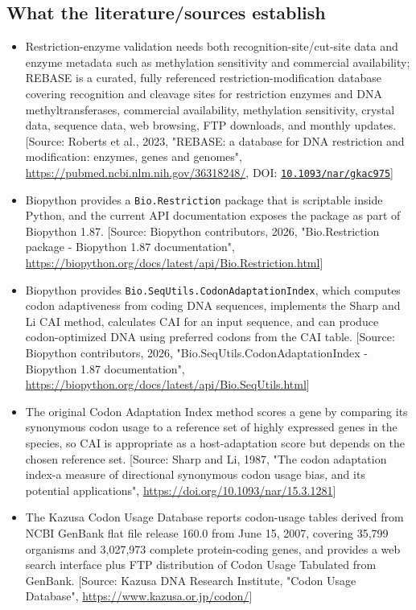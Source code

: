 \documentclass[11pt]{report}
\begin{document}
\subsection{What the literature/sources establish}
\begin{itemize}
\item Restriction-enzyme validation needs both recognition-site/cut-site data and enzyme metadata such as methylation sensitivity and commercial availability; REBASE is a curated, fully referenced restriction-modification database covering recognition and cleavage sites for restriction enzymes and DNA methyltransferases, commercial availability, methylation sensitivity, crystal data, sequence data, web browsing, FTP downloads, and monthly updates. [Source: Roberts et al., 2023, "REBASE: a database for DNA restriction and modification: enzymes, genes and genomes", \url{https://pubmed.ncbi.nlm.nih.gov/36318248/}, DOI: \href{https://doi.org/10.1093/nar/gkac975}{\nolinkurl{10.1093/nar/gkac975}}]
\item Biopython provides a \texttt{Bio.Restriction} package that is scriptable inside Python, and the current API documentation exposes the package as part of Biopython 1.87. [Source: Biopython contributors, 2026, "Bio.Restriction package - Biopython 1.87 documentation", \url{https://biopython.org/docs/latest/api/Bio.Restriction.html}]
\item Biopython provides \texttt{Bio.SeqUtils.CodonAdaptationIndex}, which computes codon adaptiveness from coding DNA sequences, implements the Sharp and Li CAI method, calculates CAI for an input sequence, and can produce codon-optimized DNA using preferred codons from the CAI table. [Source: Biopython contributors, 2026, "Bio.SeqUtils.CodonAdaptationIndex - Biopython 1.87 documentation", \url{https://biopython.org/docs/latest/api/Bio.SeqUtils.html}]
\item The original Codon Adaptation Index method scores a gene by comparing its synonymous codon usage to a reference set of highly expressed genes in the species, so CAI is appropriate as a host-adaptation score but depends on the chosen reference set. [Source: Sharp and Li, 1987, "The codon adaptation index-a measure of directional synonymous codon usage bias, and its potential applications", \url{https://doi.org/10.1093/nar/15.3.1281}]
\item The Kazusa Codon Usage Database reports codon-usage tables derived from NCBI GenBank flat file release 160.0 from June 15, 2007, covering 35,799 organisms and 3,027,973 complete protein-coding genes, and provides a web search interface plus FTP distribution of Codon Usage Tabulated from GenBank. [Source: Kazusa DNA Research Institute, "Codon Usage Database", \url{https://www.kazusa.or.jp/codon/}]

\end{itemize}
\end{document}
